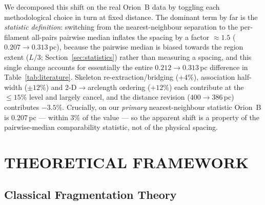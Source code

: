 \documentclass[usenatbib,twoside,twocolumn]{mnras}
\begin{document}
We decomposed this shift on the real Orion~B data by toggling each methodological choice in turn at fixed distance. The dominant term by far is the \emph{statistic definition}: switching from the nearest-neighbour separation to the per-filament all-pairs pairwise median inflates the spacing by a factor $\approx1.5$ ($0.207\to0.313$\,pc), because the pairwise median is biased towards the region extent ($L/3$; Section~\ref{sec:statistics}) rather than measuring a spacing, and this single change accounts for essentially the entire $0.212\to0.313$\,pc difference in Table~\ref{tab:literature}. Skeleton re-extraction/bridging ($+4\%$), association half-width ($\pm12\%$) and 2-D$\to$arclength ordering ($+12\%$) each contribute at the $\le15\%$ level and largely cancel, and the distance revision ($400\to386$\,pc) contributes $-3.5\%$. Crucially, on our \emph{primary} nearest-neighbour statistic Orion~B is $0.207$\,pc --- within $3\%$ of the \citet{Konyves2020} value --- so the apparent shift is a property of the pairwise-median comparability statistic, not of the physical spacing.

\section{THEORETICAL FRAMEWORK}
\label{sec:theory}

\subsection{Classical Fragmentation Theory}
\end{document}
